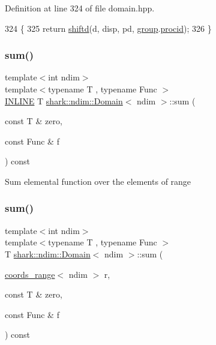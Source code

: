 Definition at line 324 of file domain.\+hpp.


\begin{DoxyCode}
324                                                                       \{
325             \textcolor{keywordflow}{return} \hyperlink{classshark_1_1ndim_1_1_domain_ae6830337d8bdd203b5267ce7666362b0}{shiftd}(d, disp, pd, \hyperlink{classshark_1_1ndim_1_1_domain_a2bbf100371762ce405efd218bc1e3d0f}{group}.\hyperlink{classshark_1_1_group_af8c22a10243c3d05301280119b72c073}{procid});
326         \}
\end{DoxyCode}
\hypertarget{classshark_1_1ndim_1_1_domain_a4acf8890a0637ff9987c4dea1f72bf79}{}\label{classshark_1_1ndim_1_1_domain_a4acf8890a0637ff9987c4dea1f72bf79} 
\subsubsection{\texorpdfstring{sum()}{sum()}\hspace{0.1cm}{\footnotesize\ttfamily [1/3]}}
{\footnotesize\ttfamily template$<$int ndim$>$ \\
template$<$typename T , typename Func $>$ \\
\hyperlink{common_8hpp_a2eb6f9e0395b47b8d5e3eeae4fe0c116}{I\+N\+L\+I\+NE} T \hyperlink{classshark_1_1ndim_1_1_domain}{shark\+::ndim\+::\+Domain}$<$ ndim $>$\+::sum (\begin{DoxyParamCaption}\item[{const T \&}]{zero,  }\item[{const Func \&}]{f }\end{DoxyParamCaption}) const}

Sum elemental function over the elements of range \hypertarget{classshark_1_1ndim_1_1_domain_a500c17d3dc9dc33f0714779306d44b35}{}\label{classshark_1_1ndim_1_1_domain_a500c17d3dc9dc33f0714779306d44b35} 
\subsubsection{\texorpdfstring{sum()}{sum()}\hspace{0.1cm}{\footnotesize\ttfamily [2/3]}}
{\footnotesize\ttfamily template$<$int ndim$>$ \\
template$<$typename T , typename Func $>$ \\
T \hyperlink{classshark_1_1ndim_1_1_domain}{shark\+::ndim\+::\+Domain}$<$ ndim $>$\+::sum (\begin{DoxyParamCaption}\item[{\hyperlink{structshark_1_1ndim_1_1coords__range}{coords\+\_\+range}$<$ ndim $>$}]{r,  }\item[{const T \&}]{zero,  }\item[{const Func \&}]{f }\end{DoxyParamCaption}) const}



